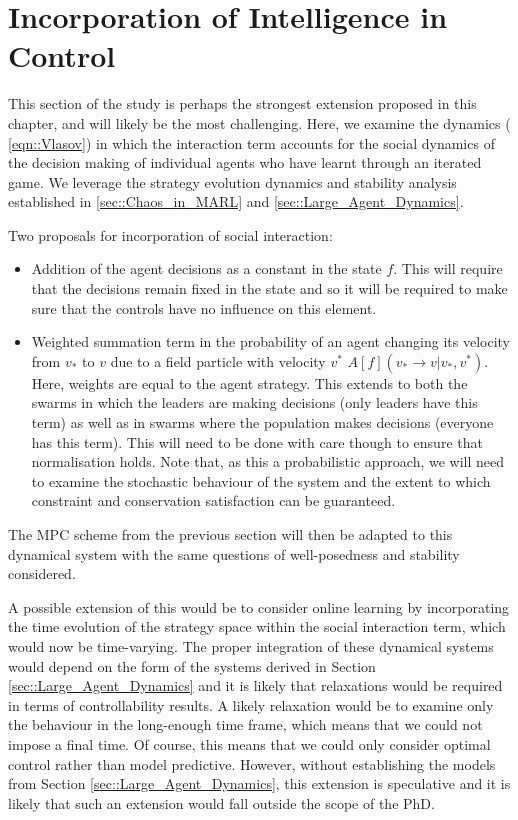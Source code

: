 \documentclass[.../main.tex]{subfiles}
\begin{document}
    \section{Incorporation of Intelligence in Control} \label{sec::Intelligence_in_control}

    This section of the study is perhaps the strongest extension proposed in this
	chapter, and will likely be the most challenging. Here, we examine the dynamics (
	\ref{eqn::Vlasov}) in which the interaction term accounts for the social dynamics of the
	decision making of individual agents who have learnt through an iterated game. We leverage the
	strategy evolution dynamics and stability analysis established in 
	\ref{sec::Chaos_in_MARL} and \ref{sec::Large_Agent_Dynamics}. 

	Two proposals for incorporation of social interaction:
	\begin{itemize}
		\item Addition of the agent decisions as a constant in the state $f$. This will require that
		the decisions remain fixed in the state and so it will be required to make sure that the
		controls have no influence on this element.
		\item Weighted summation term in the probability of an agent changing its velocity from
		$v_*$ to
		$v$ due to a field particle with velocity $v^*$ $A[f](v_* \rightarrow v | v_*, v^*)$.
		Here, weights are equal to the agent strategy. This extends to both the swarms in
		which the leaders are making decisions (only leaders have this term) as well as in
		swarms where the population makes decisions (everyone has this term). This will need to be
		done with care though to ensure that normalisation holds. Note that, as this a probabilistic
		approach, we will need to examine the stochastic behaviour of the system and the extent to
		which constraint and conservation satisfaction can be guaranteed.
	\end{itemize}

	The MPC scheme from the previous section will then be adapted to this dynamical system with the
	same questions of well-posedness and stability considered. 

	A possible extension of this would be to consider online learning by incorporating the time
	evolution of the strategy space within the social interaction term, which would now be
	time-varying. The proper integration of these dynamical systems would depend on the form of the
	systems derived in Section \ref{sec::Large_Agent_Dynamics} and it is likely that relaxations would
	be required in terms of controllability results. A likely relaxation would be to examine only the
	behaviour in the long-enough time frame, which means that we could not impose a final time. Of
	course, this means that we could only consider optimal control rather than model predictive.
	However, without establishing the models from Section \ref{sec::Large_Agent_Dynamics}, this
	extension is speculative and it is likely that such an extension would fall outside the scope of
	the PhD.

\end{document}
